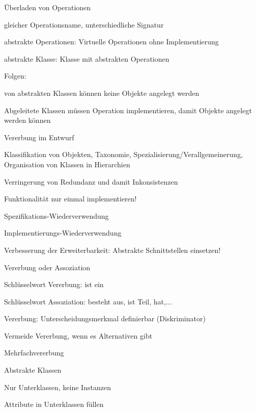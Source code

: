 \documentclass[a4paper]{article}
\begin{document}
\begin{multicols}{3}
\begin{itemize*}
\begin{itemize*}
\begin{itemize*}
        \item Überladen von Operationen
        \item gleicher Operationsname, unterschiedliche Signatur
        \item abstrakte Operationen: Virtuelle Operationen ohne Implementierung
        \item abstrakte Klasse: Klasse mit abstrakten Operationen
        \item Folgen:
        \item von abstrakten Klassen können keine Objekte angelegt werden
        \item Abgeleitete Klassen müssen Operation implementieren, damit Objekte angelegt werden können
      \end{itemize*}
    \end{itemize*}
  \end{itemize*}

  Vererbung im Entwurf
  \begin{itemize*}
    \item Klassifikation von Objekten, Taxonomie, Spezialisierung/Verallgemeinerung, Organisation von Klassen in Hierarchien
    \item Verringerung von Redundanz und damit Inkonsistenzen
    \begin{itemize*}
      \item Funktionalität nur einmal implementieren!
      \item Spezifikations-Wiederverwendung
      \item Implementierungs-Wiederverwendung
    \end{itemize*}
    \item Verbesserung der Erweiterbarkeit: Abstrakte Schnittstellen einsetzen!
  \end{itemize*}

  Vererbung oder Assoziation
  \begin{itemize*}
    \item Schlüsselwort Vererbung: ist ein
    \item Schlüsselwort Assoziation: besteht aus, ist Teil, hat,...
    \item Vererbung: Unterscheidungsmerkmal definierbar (Diskriminator)
    \item Vermeide Vererbung, wenn es Alternativen gibt
    \item Mehrfachvererbung
  \end{itemize*}

  Abstrakte Klassen
  \begin{itemize*}
    \item Nur Unterklassen, keine Instanzen
    \item Attribute in Unterklassen füllen
  \end{itemize*}


\end{multicols}
\end{document}
